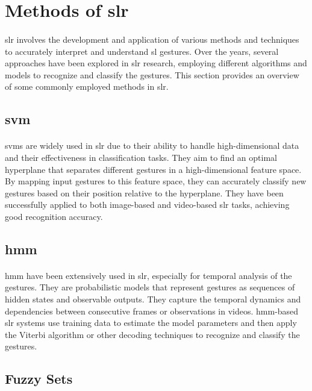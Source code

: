 \section{Methods of \ac{slr}}
\paragraph{}
\ac{slr} involves the development and application of various methods and techniques to accurately interpret and understand \ac{sl} gestures. Over the years, several approaches have been explored in \ac{slr} research, employing different algorithms and models to recognize and classify the gestures. This section provides an overview of some commonly employed methods in \ac{slr}.

\subsection{\ac{svm} }
\paragraph{}
\ac{svm}s are widely used in \ac{slr} due to their ability to handle high-dimensional data and their effectiveness in classification tasks. They aim to find an optimal hyperplane that separates different gestures in a high-dimensional feature space. By mapping input gestures to this feature space, they can accurately classify new gestures based on their position relative to the hyperplane. They have been successfully applied to both image-based and video-based \ac{slr} tasks, achieving good recognition accuracy.

\subsection{\ac{hmm}}
\paragraph{}
\ac{hmm} have been extensively used in \ac{slr}, especially for temporal analysis of the gestures. They are probabilistic models that represent gestures as sequences of hidden states and observable outputs. They capture the temporal dynamics and dependencies between consecutive frames or observations in videos. \ac{hmm}-based \ac{slr} systems use training data to estimate the model parameters and then apply the Viterbi algorithm or other decoding techniques to recognize and classify the gestures.

\subsection{Fuzzy Sets}
